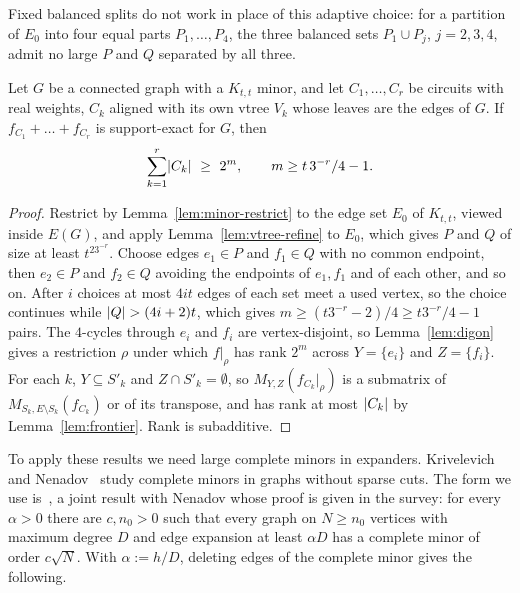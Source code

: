 Fixed balanced splits do not work in place of this adaptive choice: for a partition of $E_0$ into four equal parts $P_1,\dots,P_4$, the three balanced sets $P_1\cup P_j$, $j=2,3,4$, admit no large $P$ and $Q$ separated by all three.

\begin{theorem}\label{thm:signed-sums}
Let $G$ be a connected graph with a $K_{t,t}$ minor, and let $C_1,\dots,C_r$ be circuits with real weights, $C_k$ aligned with its own vtree $V_k$ whose leaves are the edges of $G$. If $f_{C_1}+\dots+f_{C_r}$ is support-exact for $G$, then
\[
  \sum_{k=1}^r\lvert C_k\rvert\ \ge\ 2^m,\qquad m\ge t\,3^{-r}/4-1 .
\]
\end{theorem}

\begin{proof}
Restrict by Lemma~\ref{lem:minor-restrict} to the edge set $E_0$ of $K_{t,t}$, viewed inside $E(G)$, and apply Lemma~\ref{lem:vtree-refine} to $E_0$, which gives $P$ and $Q$ of size at least $t^23^{-r}$. Choose edges $e_1\in P$ and $f_1\in Q$ with no common endpoint, then $e_2\in P$ and $f_2\in Q$ avoiding the endpoints of $e_1,f_1$ and of each other, and so on. After $i$ choices at most $4it$ edges of each set meet a used vertex, so the choice continues while $\lvert Q\rvert>(4i+2)t$, which gives $m\ge(t3^{-r}-2)/4\ge t3^{-r}/4-1$ pairs. The $4$-cycles through $e_i$ and $f_i$ are vertex-disjoint, so Lemma~\ref{lem:digon} gives a restriction $\rho$ under which $f|_\rho$ has rank $2^m$ across $Y=\{e_i\}$ and $Z=\{f_i\}$. For each $k$, $Y\subseteq S'_k$ and $Z\cap S'_k=\emptyset$, so $M_{Y,Z}(f_{C_k}|_\rho)$ is a submatrix of $M_{S_k,E\setminus S_k}(f_{C_k})$ or of its transpose, and has rank at most $\lvert C_k\rvert$ by Lemma~\ref{lem:frontier}. Rank is subadditive.
\end{proof}

To apply these results we need large complete minors in expanders. Krivelevich and Nenadov~\cite{KrivelevichNenadov21} study complete minors in graphs without sparse cuts. The form we use is~\cite[Theorem~8.4]{Krivelevich19}, a joint result with Nenadov whose proof is given in the survey: for every $\alpha>0$ there are $c,n_0>0$ such that every graph on $N\ge n_0$ vertices with maximum degree $D$ and edge expansion at least $\alpha D$ has a complete minor of order $c\sqrt N$. With $\alpha:=h/D$, deleting edges of the complete minor gives the following.

